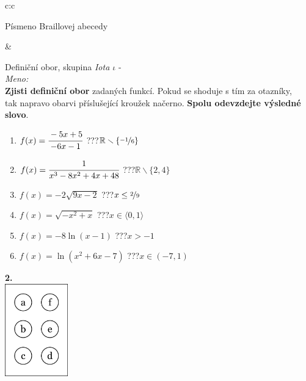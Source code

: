 \documentclass[10pt]{report}
\begin{document}
\begin{tabular}{c:c}
\begin{minipage}[c][99mm][t]{0.49\linewidth}
\begin{center}
\begin{minipage}{0.20\linewidth}
\begin{center}
{\small Písmeno Braillovej abecedy}
\end{center}
\end{minipage}
\end{center}
\end{minipage}
&
\begin{minipage}[c][99mm][t]{0.49\linewidth}
\begin{center}
\vspace{7mm}
{\huge Definiční obor, skupina \textit{Iota $\iota$} -}\\[4.5mm]
\textit{Meno:}\phantom{xxxxxxxxxxxxxxxxxxxxxxxxxxxxxxxxxxxxxxxxxxxxxxxxxxxxxxxxxxxxxxxxx}\\[3.5mm]
\textbf{Zjisti definiční obor} zadaných funkcí. Pokud se shoduje s tím za otazníky,\\tak napravo obarvi příslušející kroužek načerno. \textbf{Spolu odevzdejte výsledné slovo}.\\[3mm]
\begin{minipage}{0.77\linewidth}
\begin{center}
\begin{varwidth}{\textwidth}
\begin{enumerate}
\normalsize
\item $f(x)=\cfrac{-5x+5}{-6x-1}$\quad \dotfill\; ???\;\dotfill \quad $\mathbb{R}\smallsetminus\{\nicefrac{-1}{6}\}$
\item $f(x)=\cfrac{1}{x^3-8x^2+4x+48}$\quad \dotfill\; ???\;\dotfill \quad $\mathbb{R}\smallsetminus\{2,4\}$
\item $f(x)=-2\sqrt{9x-2}$\quad \dotfill\; ???\;\dotfill \quad $x\leq\nicefrac{2}{9}$
\item $f(x)=\sqrt{-x^2+x}$\quad \dotfill\; ???\;\dotfill \quad $x\in\langle0 , 1\rangle$
\item $f(x)=-8\ln{(x-1)}$\quad \dotfill\; ???\;\dotfill \quad $x>-1$
\item $f(x)=\ln{(x^2+6x-7)}$\quad \dotfill\; ???\;\dotfill \quad $x\in(-7 , 1)$
\end{enumerate}
\end{varwidth}
\end{center}
\end{minipage}
\begin{minipage}{0.20\linewidth}
\begin{center}
{\Huge\bfseries 2.} \\[2mm]
\includegraphics[height=40mm]{../images/braille.png}

\end{center}
\end{minipage}
\end{center}
\end{minipage}
\end{tabular}
\end{document}
